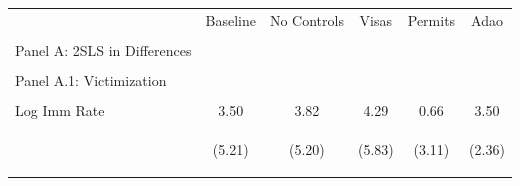 \begin{center}
\begin{tabular}{lccccc}
\hline \noalign{\smallskip} & Baseline & No Controls & Visas & Permits & Adao\\
 &  &  &  &  & \\
\noalign{\smallskip}\hline \noalign{\smallskip}Panel A: 2SLS in Differences &  &  &  &  & \\
 & \begin{footnotesize}\end{footnotesize} & \begin{footnotesize}\end{footnotesize} & \begin{footnotesize}\end{footnotesize} & \begin{footnotesize}\end{footnotesize} & \begin{footnotesize}\end{footnotesize}\\
\noalign{\smallskip}Panel A.1: Victimization &  &  &  &  & \\
 & \begin{footnotesize}\end{footnotesize} & \begin{footnotesize}\end{footnotesize} & \begin{footnotesize}\end{footnotesize} & \begin{footnotesize}\end{footnotesize} & \begin{footnotesize}\end{footnotesize}\\
\noalign{\smallskip}Log Imm Rate & 3.50 & 3.82 & 4.29 & 0.66 & 3.50\\
 & \begin{footnotesize}(5.21)\end{footnotesize} & \begin{footnotesize}(5.20)\end{footnotesize} & \begin{footnotesize}(5.83)\end{footnotesize} & \begin{footnotesize}(3.11)\end{footnotesize} & \begin{footnotesize}(2.36)\end{footnotesize}\\

\end{tabular}
\end{center}

